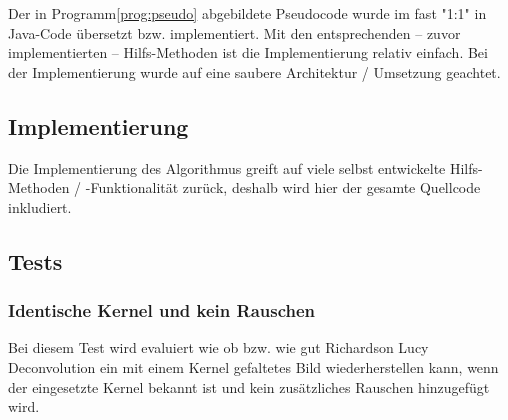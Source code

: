 \documentclass[german,notitlepage,smartquotes]{hgbreport}
\begin{document}
Der in Programm\ref{prog:pseudo} abgebildete Pseudocode wurde im fast "1:1" in Java-Code übersetzt bzw. implementiert. Mit den entsprechenden -- zuvor implementierten -- Hilfs-Methoden ist die Implementierung relativ einfach. Bei der Implementierung wurde auf eine saubere Architektur / Umsetzung geachtet.

\clearpage

\subsection{Implementierung}

Die Implementierung des Algorithmus greift auf viele selbst entwickelte Hilfs\--Methoden / -Funktionalität zurück, deshalb wird hier der gesamte Quellcode inkludiert.












\clearpage

\subsection{Tests}

\subsubsection{Identische Kernel und kein Rauschen}

Bei diesem Test wird evaluiert wie ob bzw. wie gut Richardson Lucy Deconvolution ein mit einem Kernel gefaltetes Bild wiederherstellen kann, wenn der eingesetzte Kernel bekannt ist und kein zusätzliches Rauschen hinzugefügt wird.
\end{document}
